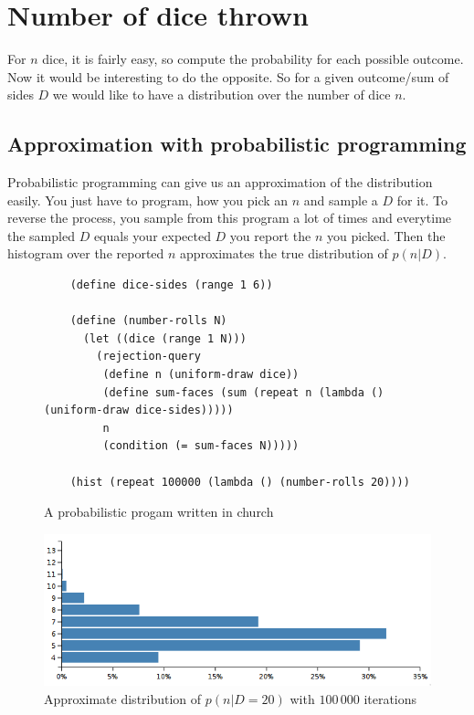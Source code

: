 \documentclass[10pt,a4paper]{article}
\begin{document}
\section{Number of dice thrown}

For $n$ dice, it is fairly easy, so compute the probability for each possible
outcome. Now it would be interesting to do the opposite. So for a given
outcome/sum of sides $D$ we would like to have a distribution over the number of
dice $n$.

\subsection{Approximation with probabilistic programming}

Probabilistic programming can give us an approximation of the distribution
easily. You just have to program, how you pick an $n$ and sample a $D$ for
it. To reverse the process, you sample from this program a lot of times and
everytime the sampled $D$ equals your expected $D$ you report the $n$ you
picked. Then the histogram over the reported $n$ approximates the true
distribution of $p(n | D)$.

\begin{figure}[h]
  \centering
  \begin{verbatim}
    (define dice-sides (range 1 6))

    (define (number-rolls N)
      (let ((dice (range 1 N)))
        (rejection-query
         (define n (uniform-draw dice))
         (define sum-faces (sum (repeat n (lambda () (uniform-draw dice-sides)))))
         n
         (condition (= sum-faces N)))))

    (hist (repeat 100000 (lambda () (number-rolls 20))))
  \end{verbatim}
  \caption{A probabilistic progam written in church}
\end{figure}
\begin{figure}[h]
  \centering
  \includegraphics[width=350pt]{church-approx}
  \caption{Approximate distribution of $p(n | D = 20)$ with $100\,000$ iterations}
\end{figure}
\end{document}

